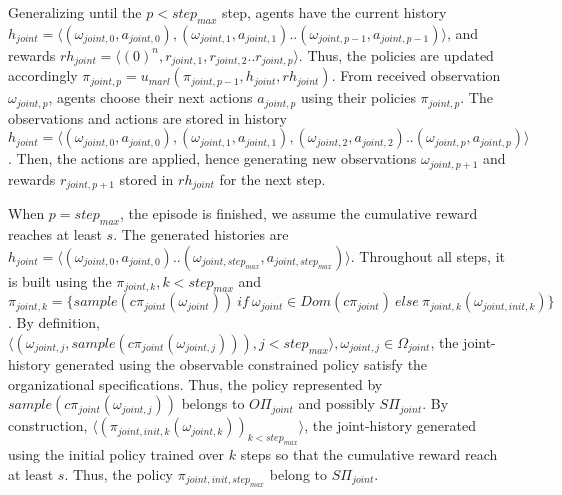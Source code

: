 \begin{proofoutline}


    Generalizing until the $p < step_{max}$ step, agents have the current history $h_{joint} = \langle (\omega_{joint,0}, \allowbreak a_{joint,0}), (\omega_{joint,1}, a_{joint,1})..(\omega_{joint,p-1}, a_{joint,p-1}) \rangle$, and rewards $rh_{joint} = \langle (0)^n, r_{joint,1}, r_{joint,2}..r_{joint,p} \rangle$. Thus, the policies are updated accordingly $\pi_{joint,p} = u_{marl}(\pi_{joint,p-1},h_{joint},rh_{joint})$. From received observation $\omega_{joint,p}$, agents choose their next actions $a_{joint,p}$ using their policies $\pi_{joint,p}$. The observations and actions are stored in history $h_{joint} \allowbreak = \allowbreak \langle \allowbreak (\omega_{joint,0},a_{joint,0}), \allowbreak (\omega_{joint,1},a_{joint,1}), (\omega_{joint,2},a_{joint,2})..(\omega_{joint,p},a_{joint,p}) \rangle$. Then, the actions are applied, hence generating new observations $\omega_{joint,p+1}$ and rewards $r_{joint,p+1}$ stored in $rh_{joint}$ for the next step.

    When $p = step_{max}$, the episode is finished, we assume the cumulative reward reaches at least $s$. The generated histories are $h_{joint} = \langle (\omega_{joint,0}, \allowbreak a_{joint,0}) .. \allowbreak (\omega_{joint,step_{max}},a_{joint,step_{max}}) \rangle$. Throughout all steps, it is built using the $\pi_{joint,k}, \allowbreak k < step_{max}$ and $\pi_{joint,k} \allowbreak = \allowbreak \{sample(c\pi_{joint}(\omega_{joint})) \allowbreak \ \allowbreak if \allowbreak \ \allowbreak \omega_{joint} \in Dom(c\pi_{joint}) \allowbreak \ \allowbreak else \allowbreak \ \allowbreak \pi_{joint,k}(\omega_{joint,init,k})\}$.
    By definition, $\langle (\omega_{joint,j}, \allowbreak sample(c\pi_{joint}(\omega_{joint,j}))), \allowbreak j < step_{max} \rangle, \allowbreak \omega_{joint,j} \allowbreak \in \Omega_{joint}$, the joint-history generated using the observable constrained policy satisfy the organizational specifications. Thus, the policy represented by $sample(c\pi_{joint}(\omega_{joint,j}))$ belongs to $O\Pi_{joint}$ and possibly $S\Pi_{joint}$.
    By construction, $\langle (\pi_{joint,init,k}(\omega_{joint,k}))_{k < step_{max}} \rangle$, the joint-history generated using the initial policy trained over $k$ steps so that the cumulative reward reach at least $s$. Thus, the policy $\pi_{joint,init,step_{max}}$ belong to $S\Pi_{joint}$.


\end{proofoutline}
